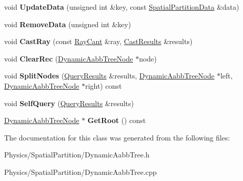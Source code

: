 \begin{DoxyCompactItemize}
\item 
\mbox{\label{classDynamicAabbTree_acacce0180628f79c049fde2af0c64a33}} 
void {\bfseries Update\+Data} (unsigned int \&key, const \hyperlink{classSpatialPartitionData}{Spatial\+Partition\+Data} \&data)
\item 
\mbox{\label{classDynamicAabbTree_a57bb2fa78ba6a3932f125be5e06200db}} 
void {\bfseries Remove\+Data} (unsigned int \&key)
\item 
\mbox{\label{classDynamicAabbTree_a6b696b5d7886bc26ec7ee81a090bbbb9}} 
void {\bfseries Cast\+Ray} (const \hyperlink{classRayCant}{Ray\+Cant} \&ray, \hyperlink{classCastResults}{Cast\+Results} \&results)
\item 
\mbox{\label{classDynamicAabbTree_abaf141451bf5b62373a6a8d978bd877f}} 
void {\bfseries Clear\+Rec} (\hyperlink{classDynamicAabbTreeNode}{Dynamic\+Aabb\+Tree\+Node} $\ast$node)
\item 
\mbox{\label{classDynamicAabbTree_a414b8be117907a2663d3545f991893b4}} 
void {\bfseries Split\+Nodes} (\hyperlink{classQueryResults}{Query\+Results} \&results, \hyperlink{classDynamicAabbTreeNode}{Dynamic\+Aabb\+Tree\+Node} $\ast$left, \hyperlink{classDynamicAabbTreeNode}{Dynamic\+Aabb\+Tree\+Node} $\ast$right) const
\item 
\mbox{\label{classDynamicAabbTree_aeac77e79abc258f405a0a31e6bfe76e6}} 
void {\bfseries Self\+Query} (\hyperlink{classQueryResults}{Query\+Results} \&results)
\item 
\mbox{\label{classDynamicAabbTree_ad0e823a4a4e9bef83b3fb8d846d078e0}} 
\hyperlink{classDynamicAabbTreeNode}{Dynamic\+Aabb\+Tree\+Node} $\ast$ {\bfseries Get\+Root} () const
\end{DoxyCompactItemize}


The documentation for this class was generated from the following files\+:\begin{DoxyCompactItemize}
\item 
Physics/\+Spatial\+Partition/Dynamic\+Aabb\+Tree.\+h\item 
Physics/\+Spatial\+Partition/Dynamic\+Aabb\+Tree.\+cpp\end{DoxyCompactItemize}
